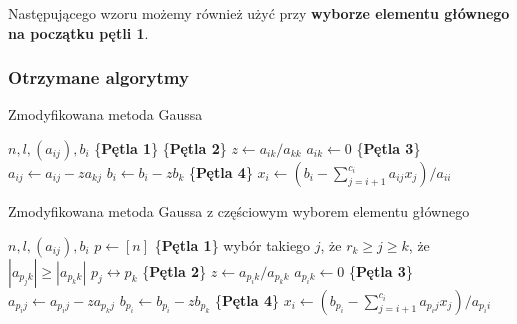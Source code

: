 \documentclass[12pt]{article}
\begin{document}
Następującego wzoru możemy również użyć przy \textbf{wyborze elementu głównego na początku pętli 1}.

\subsubsection*{Otrzymane algorytmy}

\begin{algorithm} %
\caption{Zmodyfikowana metoda Gaussa}
\label{alg3} %
\begin{algorithmic} %
    \REQUIRE $n, l, (a_{ij}), b_i$
    \STATE \{\textbf{Pętla 1}\}
    		\STATE \{\textbf{Pętla 2}\}
		\STATE $z \leftarrow a_{ik}/a_{kk}$
		\STATE $a_{ik} \leftarrow 0$
    			\STATE \{\textbf{Pętla 3}\}
				\STATE $a_{ij} \leftarrow a_{ij} - z a_{kj}$
    			\ENDFOR
    			\STATE $b_i \leftarrow b_i - z b_k$
    		\ENDFOR
    \ENDFOR
    \STATE \{\textbf{Pętla 4}\}
		\STATE $x_i \leftarrow (b_i - \sum^{c_i}_{j=i+1}a_{ij}x_j)/a_{ii}$
    \ENDFOR
\end{algorithmic}
\end{algorithm}


\clearpage
\begin{algorithm} %
\caption{Zmodyfikowana metoda Gaussa z częściowym wyborem elementu głównego}
\label{alg4} %
\begin{algorithmic} %
    \REQUIRE $n, l, (a_{ij}), b_i$
    \STATE $p \leftarrow [n]$
    \STATE \{\textbf{Pętla 1}\}
		\STATE wybór takiego $j$, że $r_k \geq j \geq k$, że $|a_{p_jk}| \geq |a_{p_kk}|$
		\STATE $p_j \leftrightarrow p_k$
    		\STATE \{\textbf{Pętla 2}\}
		\STATE $z \leftarrow a_{p_ik}/a_{p_kk}$
		\STATE $a_{p_ik} \leftarrow 0$
    			\STATE \{\textbf{Pętla 3}\}
				\STATE $a_{p_ij} \leftarrow a_{p_ij} - z a_{p_kj}$
    			\ENDFOR
    			\STATE $b_{p_i} \leftarrow b_{p_i} - z b_{p_k}$
    		\ENDFOR
    \ENDFOR
    \STATE \{\textbf{Pętla 4}\}
		\STATE $x_i \leftarrow (b_{p_i} - \sum^{c_i}_{j=i+1}a_{p_ij}x_j)/a_{p_ii}$
    \ENDFOR
\end{algorithmic}
\end{algorithm}
\end{document}
